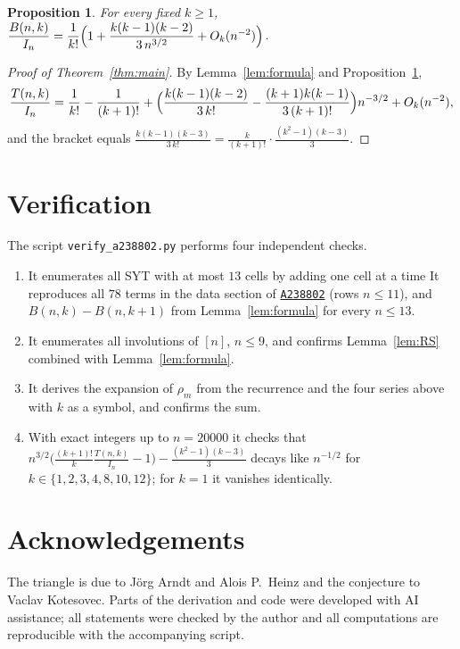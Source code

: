 \documentclass[11pt,a4paper]{article}
\newtheorem{proposition}[theorem]{Proposition}
\theoremstyle{remark}
\newcommand{\oeis}[1]{\href{https://oeis.org/#1}{\texttt{#1}}}
\begin{document}
\begin{proposition}\label{prop:B}
For every fixed $k\ge1$, $\displaystyle\frac{B(n,k)}{I_n}=\frac1{k!}\Bigl(1+\frac{k(k-1)(k-2)}{3\,n^{3/2}}+O_k(n^{-2})\Bigr)$.
\end{proposition}

\begin{proof}[Proof of Theorem~\ref{thm:main}]
By Lemma~\ref{lem:formula} and Proposition~\ref{prop:B},
\[
 \frac{T(n,k)}{I_n}=\frac1{k!}-\frac1{(k+1)!}+\Bigl(\frac{k(k-1)(k-2)}{3\,k!}-\frac{(k+1)k(k-1)}{3\,(k+1)!}\Bigr)n^{-3/2}+O_k(n^{-2}),
\]
and the bracket equals $\frac{k(k-1)(k-3)}{3\,k!}=\frac k{(k+1)!}\cdot\frac{(k^2-1)(k-3)}3$.
\end{proof}

\section{Verification}

The script \texttt{verify\_a238802.py} performs four independent checks.
\begin{enumerate}
\item It enumerates all SYT with at most $13$ cells by adding one cell at a time It reproduces all $78$ terms in the data section of \oeis{A238802} (rows $n\le11$), and $B(n,k)-B(n,k+1)$ from Lemma~\ref{lem:formula} for every $n\le13$.
\item It enumerates all involutions of $[n]$, $n\le9$, and confirms Lemma~\ref{lem:RS} combined with Lemma~\ref{lem:formula}.
\item It derives the expansion of $\rho_m$ from the recurrence and the four series above with $k$ as a symbol, and confirms the sum.
\item With exact integers up to $n=20000$ it checks that $n^{3/2}\bigl(\frac{(k+1)!}{k}\frac{T(n,k)}{I_n}-1\bigr)-\frac{(k^2-1)(k-3)}3$ decays like $n^{-1/2}$ for $k\in\{1,2,3,4,8,10,12\}$; for $k=1$ it vanishes identically.
\end{enumerate}

\section*{Acknowledgements}
The triangle is due to J\"org Arndt and Alois P.~Heinz and the conjecture to Vaclav Kotesovec. Parts of the derivation and code were developed with AI assistance; all statements were checked by the author and all computations are reproducible with the accompanying script.
\end{document}
